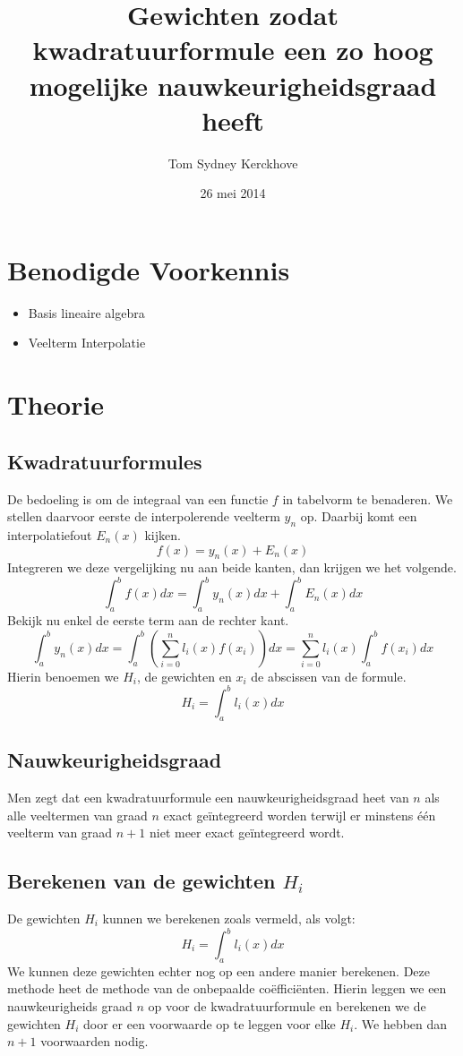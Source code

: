\documentclass[12pt,a4paper]{article}
\author{Tom Sydney Kerckhove}
\title{Gewichten zodat kwadratuurformule een zo hoog mogelijke nauwkeurigheidsgraad heeft}
\date{26 mei 2014}
\begin{document}
\maketitle
\tableofcontents


\section{Benodigde Voorkennis}
\begin{itemize}
\item Basis lineaire algebra
\item Veelterm Interpolatie
\end{itemize}


\pagebreak
\section{Theorie}
\subsection{Kwadratuurformules}
De bedoeling is om de integraal van een functie $f$ in tabelvorm te benaderen. We stellen daarvoor eerste de interpolerende veelterm $y_n$ op. Daarbij komt een interpolatiefout $E_n(x)$ kijken.
\[
f(x) = y_n(x) + E_n(x)
\]
Integreren we deze vergelijking nu aan beide kanten, dan krijgen we het volgende.
\[
\int_{a}^{b}f(x)dx = \int_{a}^{b}y_n(x)dx + \int_{a}^{b}E_n(x)dx
\]
Bekijk nu enkel de eerste term aan de rechter kant.
\[
\int_{a}^{b}y_n(x)dx
= \int_{a}^{b}\left(\sum_{i=0}^{n}l_i(x)f(x_i)\right)dx
=\sum_{i=0}^{n}l_i(x)\int_{a}^{b}f(x_i)dx
\]
Hierin benoemen we $H_i$, de gewichten en $x_i$ de abscissen van de formule.
\[
H_i = \int_a^{b}l_i(x)dx
\]

\subsection{Nauwkeurigheidsgraad}
Men zegt dat een kwadratuurformule een nauwkeurigheidsgraad heet van $n$ als alle veeltermen van graad $n$ exact ge\"integreerd worden terwijl er minstens \'e\'en veelterm van graad $n+1$ niet meer exact ge\"integreerd wordt.

\subsection{Berekenen van de gewichten $H_i$}
De gewichten $H_i$ kunnen we berekenen zoals vermeld, als volgt:
\[
H_i = \int_{a}^{b}l_i(x)dx
\]
We kunnen deze gewichten echter nog op een andere manier berekenen. Deze methode heet de methode van de onbepaalde co\"effici\"enten. Hierin leggen we een nauwkeurigheids graad $n$ op voor de kwadratuurformule en berekenen we de gewichten $H_i$ door er een voorwaarde op te leggen voor elke $H_i$. We hebben dan $n+1$ voorwaarden nodig.
\end{document}
